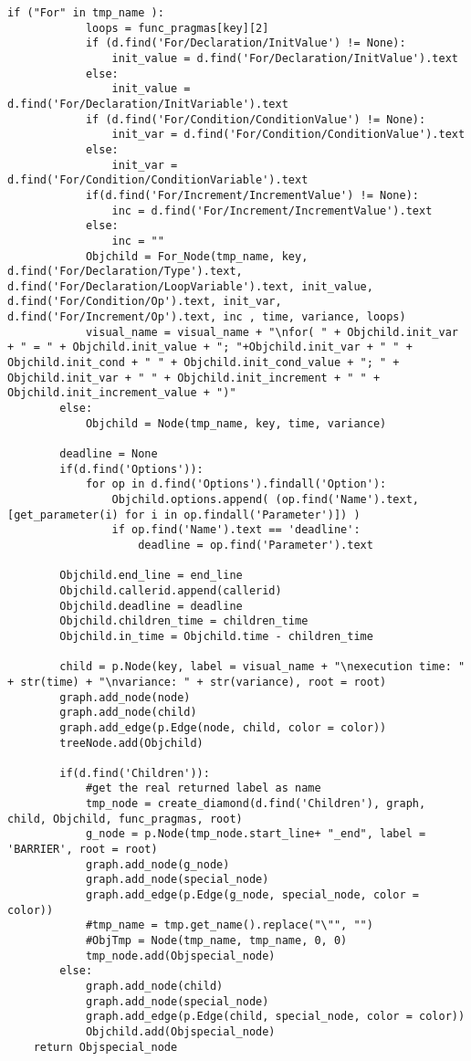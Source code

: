 \documentclass[a4paper,10pt,twoside]{book}
\begin{document}
\begin{lstlisting}[language=CCC, caption=pargraph.py]
		if ("For" in tmp_name ):
			loops = func_pragmas[key][2]
			if (d.find('For/Declaration/InitValue') != None):
				init_value = d.find('For/Declaration/InitValue').text
			else:
				init_value = d.find('For/Declaration/InitVariable').text
			if (d.find('For/Condition/ConditionValue') != None):
				init_var = d.find('For/Condition/ConditionValue').text
			else:
				init_var = d.find('For/Condition/ConditionVariable').text
			if(d.find('For/Increment/IncrementValue') != None):
				inc = d.find('For/Increment/IncrementValue').text
			else:
				inc = ""
			Objchild = For_Node(tmp_name, key, d.find('For/Declaration/Type').text, d.find('For/Declaration/LoopVariable').text, init_value, d.find('For/Condition/Op').text, init_var, d.find('For/Increment/Op').text, inc , time, variance, loops)
			visual_name = visual_name + "\nfor( " + Objchild.init_var + " = " + Objchild.init_value + "; "+Objchild.init_var + " " + Objchild.init_cond + " " + Objchild.init_cond_value + "; " + Objchild.init_var + " " + Objchild.init_increment + " " + Objchild.init_increment_value + ")"
		else:
			Objchild = Node(tmp_name, key, time, variance)

		deadline = None
		if(d.find('Options')):
			for op in d.find('Options').findall('Option'):
				Objchild.options.append( (op.find('Name').text,[get_parameter(i) for i in op.findall('Parameter')]) )
				if op.find('Name').text == 'deadline':
					deadline = op.find('Parameter').text

		Objchild.end_line = end_line
		Objchild.callerid.append(callerid)
		Objchild.deadline = deadline
		Objchild.children_time = children_time
		Objchild.in_time = Objchild.time - children_time

		child = p.Node(key, label = visual_name + "\nexecution time: " + str(time) + "\nvariance: " + str(variance), root = root)
		graph.add_node(node)
		graph.add_node(child)
		graph.add_edge(p.Edge(node, child, color = color))
		treeNode.add(Objchild)

		if(d.find('Children')):
			#get the real returned label as name
			tmp_node = create_diamond(d.find('Children'), graph, child, Objchild, func_pragmas, root)
			g_node = p.Node(tmp_node.start_line+ "_end", label = 'BARRIER', root = root)
			graph.add_node(g_node)
			graph.add_node(special_node)
			graph.add_edge(p.Edge(g_node, special_node, color = color))
			#tmp_name = tmp.get_name().replace("\"", "") 
			#ObjTmp = Node(tmp_name, tmp_name, 0, 0)
			tmp_node.add(Objspecial_node)
		else:
			graph.add_node(child)
			graph.add_node(special_node)
			graph.add_edge(p.Edge(child, special_node, color = color))
			Objchild.add(Objspecial_node)
	return Objspecial_node


\end{lstlisting}
\end{document}
